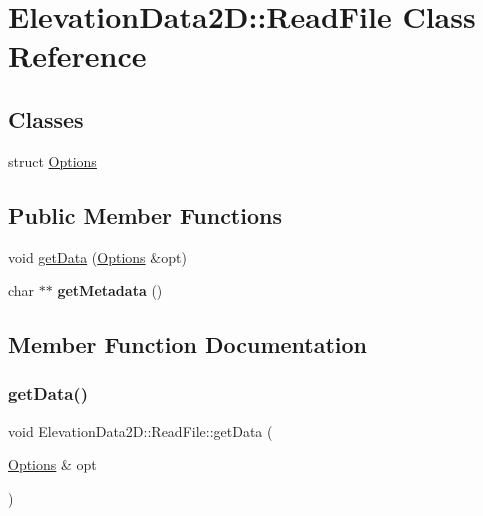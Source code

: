 \hypertarget{classElevationData2D_1_1ReadFile}{}\section{Elevation\+Data2D\+:\+:Read\+File Class Reference}
\label{classElevationData2D_1_1ReadFile}
\subsection*{Classes}
\begin{DoxyCompactItemize}
\item 
struct \mbox{\hyperlink{structElevationData2D_1_1ReadFile_1_1Options}{Options}}
\end{DoxyCompactItemize}
\subsection*{Public Member Functions}
\begin{DoxyCompactItemize}
\item 
void \mbox{\hyperlink{classElevationData2D_1_1ReadFile_a48f8771b1f5d46693205c604fc33d84f}{get\+Data}} (\mbox{\hyperlink{structElevationData2D_1_1ReadFile_1_1Options}{Options}} \&opt)
\item 
\mbox{\label{classElevationData2D_1_1ReadFile_ac8836783bd763cc6c0711761cfb80ae4}} 
char $\ast$$\ast$ {\bfseries get\+Metadata} ()
\end{DoxyCompactItemize}


\subsection{Member Function Documentation}
\mbox{\label{classElevationData2D_1_1ReadFile_a48f8771b1f5d46693205c604fc33d84f}} 
\subsubsection{\texorpdfstring{get\+Data()}{getData()}}
{\footnotesize\ttfamily void Elevation\+Data2\+D\+::\+Read\+File\+::get\+Data (\begin{DoxyParamCaption}\item[{\mbox{\hyperlink{structElevationData2D_1_1ReadFile_1_1Options}{Options}} \&}]{opt }\end{DoxyParamCaption})}

